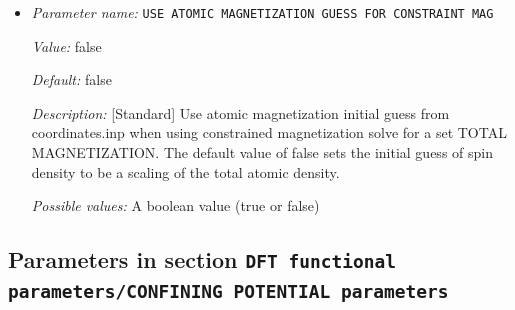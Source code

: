 \begin{itemize}
{\it Value:} 0.0


{\it Default:} 0.0


{\it Description:} [Standard] Total magnetization to be used for constrained spin-polarized DFT calculations (must be between -1.0 and +1.0). Corresponding magnetization per simulation domain will be (TOTAL MAGNETIZATION x Number of electrons) a.u. 


{\it Possible values:} A floating point number $v$ such that $-1 \leq v \leq 1$
\item {\it Parameter name:} {\tt USE ATOMIC MAGNETIZATION GUESS FOR CONSTRAINT MAG}
\label{parameters:DFT functional parameters/USE ATOMIC MAGNETIZATION GUESS FOR CONSTRAINT MAG}
\label{parameters:DFT_20functional_20parameters/USE_20ATOMIC_20MAGNETIZATION_20GUESS_20FOR_20CONSTRAINT_20MAG}


{\it Value:} false


{\it Default:} false


{\it Description:} [Standard] Use atomic magnetization initial guess from coordinates.inp when using constrained magnetization solve for a set TOTAL MAGNETIZATION. The default value of false sets the initial guess of spin density to be a scaling of the total atomic density. 


{\it Possible values:} A boolean value (true or false)
\end{itemize}



\subsection{Parameters in section \tt DFT functional parameters/CONFINING POTENTIAL parameters}
\label{parameters:DFT_20functional_20parameters/CONFINING_20POTENTIAL_20parameters}

